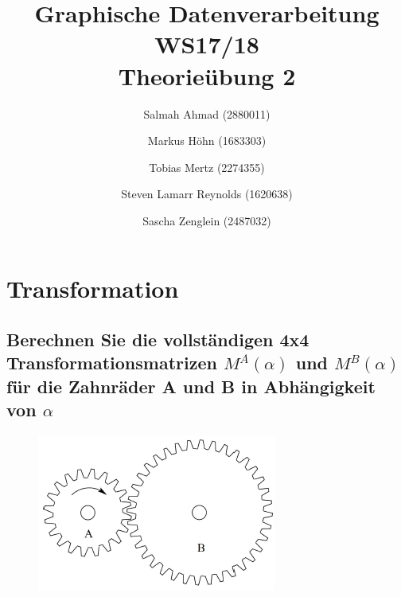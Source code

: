\documentclass[a4paper,10pt,DIV=14]{article}
\begin{document}
\title{Graphische Datenverarbeitung WS17/18 \\ Theorieübung 2}
\author{
  Salmah Ahmad (2880011)
  \and
  Markus Höhn (1683303)
  \and
  Tobias Mertz (2274355)
  \and
  Steven Lamarr Reynolds (1620638)
  \and
  Sascha Zenglein (2487032)
}

\maketitle

\section{Transformation}

\subsection{Berechnen Sie die vollständigen 4x4 Transformationsmatrizen $M^A(\alpha)$ und $M^B(\alpha)$ für die Zahnräder A und B in Abhängigkeit von $\alpha$}

\begin{figure}[!htbp]
	\centering
	\includegraphics[]{gear}
\end{figure}
\end{document}
